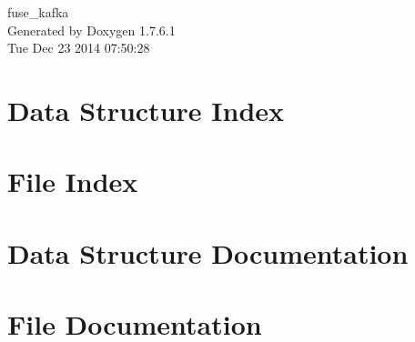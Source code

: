 \documentclass[a4paper]{book}
\begin{document}
\hypersetup{pageanchor=false,citecolor=blue}
\begin{titlepage}
\vspace*{7cm}
\begin{center}
{\Large fuse\-\_\-kafka }\\
\vspace*{1cm}
{\large \-Generated by Doxygen 1.7.6.1}\\
\vspace*{0.5cm}
{\small Tue Dec 23 2014 07:50:28}\\
\end{center}
\end{titlepage}
\clearemptydoublepage
{}
\tableofcontents
\clearemptydoublepage
{}
\hypersetup{pageanchor=true,citecolor=blue}
\chapter{\-Data \-Structure \-Index}

\chapter{\-File \-Index}

\chapter{\-Data \-Structure \-Documentation}
















\chapter{\-File \-Documentation}








\printindex
\end{document}
